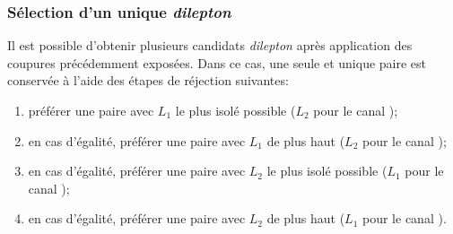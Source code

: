 \subsubsection{Sélection d'un unique \emph{dilepton}}\label{chapter-HTT_analysis-section-offline-dilepton}
Il est possible d'obtenir plusieurs candidats \emph{dilepton} après application des coupures précédemment exposées.
Dans ce cas, une seule et unique paire est conservée à l'aide des étapes de réjection suivantes:
\begin{enumerate}
    \item préférer une paire avec $L_1$ le plus isolé possible ($L_2$ pour le canal \ele\mu);
    \item en cas d'égalité, préférer une paire avec $L_1$ de plus haut \pT ($L_2$ pour le canal \ele\mu);
    \item en cas d'égalité, préférer une paire avec $L_2$ le plus isolé possible ($L_1$ pour le canal \ele\mu);
    \item en cas d'égalité, préférer une paire avec $L_2$ de plus haut \pT ($L_1$ pour le canal \ele\mu).
\end{enumerate}